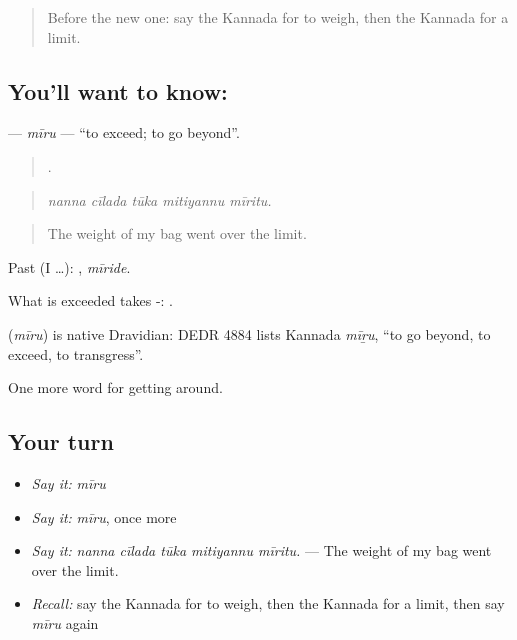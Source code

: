 \label{lesson:KA-C438-miru}



\begin{quote}
Before the new one: say the Kannada for to weigh, then the Kannada for a limit.
\end{quote}

\subsection*{You'll want to know: }
\textbf{} — \emph{mīru} — \textquotedblleft{}to exceed; to go beyond\textquotedblright{}.

\begin{quote}
    .
\end{quote}

\begin{quote}
\emph{nanna cīlada tūka mitiyannu mīritu.}
\end{quote}

\begin{quote}
The weight of my bag went over the limit.
\end{quote}

Past (I …): , \emph{mīride}.

What is exceeded takes -:  .

\begin{cousinweb}
\textbf{} (\emph{mīru}) is native Dravidian: DEDR 4884 lists Kannada \emph{mīṟu}, \textquotedblleft{}to go beyond, to exceed, to transgress\textquotedblright{}.
\end{cousinweb}

\begin{grammarlens}[title={What you've built}]
One more word for getting around.
\end{grammarlens}

\subsection*{Your turn}
\begin{itemize}
\raggedright
  \item \emph{Say it:} \emph{mīru}
  \item \emph{Say it:} \emph{mīru}, once more
  \item \emph{Say it:} \emph{nanna cīlada tūka mitiyannu mīritu.} — The weight of my bag went over the limit.
  \item \emph{Recall:} say the Kannada for to weigh, then the Kannada for a limit, then say \emph{mīru} again
\end{itemize}

